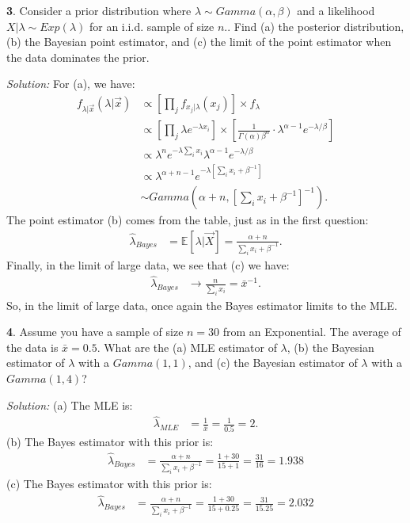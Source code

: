 \documentclass{tufte-handout}
\begin{document}
\textbf{3}. Consider a prior distribution where $\lambda \sim Gamma(\alpha, \beta)$ and a 
likelihood $X|\lambda \sim Exp(\lambda)$ for an i.i.d. sample of size $n$..
Find (a) the posterior distribution, (b) the Bayesian point estimator, and (c) the
limit of the point estimator when the data dominates the prior.

\textit{Solution:} For (a), we have:
\begin{align*}
f_{\lambda | \vec{x}}(\lambda | \vec{x}) 
&\propto \left[ \prod_j f_{x_j|\lambda}(x_j) \right] \times f_{\lambda} \\
&\propto \left[ \prod_j \lambda e^{-\lambda x_i} \right] \times \left[ \frac{1}{\Gamma(\alpha) \beta^{\alpha}} \cdot \lambda^{\alpha - 1} e^{-\lambda/\beta} \right] \\
&\propto \lambda^n e^{-\lambda \sum_i x_i} \lambda^{\alpha - 1} e^{-\lambda/\beta} \\
&\propto \lambda^{\alpha + n - 1} e^{-\lambda [\sum_i x_i + \beta^{-1}]} \\
&\sim Gamma(\alpha + n, [\sum_i x_i + \beta^{-1}]^{-1}).
\end{align*}
The point estimator (b) comes from the table, just as in the first question:
\begin{align*}
\hat{\lambda}_{Bayes} &= \mathbb{E}[ \lambda | \vec{X} ] = \frac{\alpha + n}{\sum_i x_i + \beta^{-1}}.
\end{align*}
Finally, in the limit of large data, we see that (c) we have:
\begin{align*}
\hat{\lambda}_{Bayes} &\rightarrow \frac{n}{\sum_i x_i} = \bar{x}^{-1}.
\end{align*}
So, in the limit of large data, once again the Bayes estimator limits to the MLE.

\textbf{4}. Assume you have a sample of size $n = 30$ from an Exponential. The 
average of the data is $\bar{x} = 0.5$. What are the (a) MLE estimator of $\lambda$,
(b) the Bayesian estimator of $\lambda$ with a $Gamma(1, 1)$, and (c) the
Bayesian estimator of $\lambda$ with a $Gamma(1, 4)$?

\textit{Solution:} (a) The MLE is:
\begin{align*}
\hat{\lambda}_{MLE} &= \frac{1}{\bar{x}} = \frac{1}{0.5} = 2.
\end{align*}
(b) The Bayes estimator with this prior is:
\begin{align*}
\hat{\lambda}_{Bayes} &= \frac{\alpha + n}{\sum_i x_i + \beta^{-1}} = \frac{1 + 30}{15 + 1} = \frac{31}{16} = 1.938
\end{align*}
(c) The Bayes estimator with this prior is:
\begin{align*}
\hat{\lambda}_{Bayes} &= \frac{\alpha + n}{\sum_i x_i + \beta^{-1}} = \frac{1 + 30}{15 + 0.25} = \frac{31}{15.25} = 2.032
\end{align*}
\end{document}

